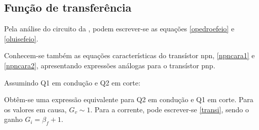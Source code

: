 \documentclass[%
  reprint,
  nofootinbib,
  amsmath,amssymb,
  aps,
  10pt,
  a4paper
]{revtex4-1}
\begin{document}
\subsection{Função de transferência}
Pela análise do circuito da , podem escrever-se as equações \eqref{opedroefeio} e \eqref{oluisefeio}.

Conhecem-se também as equações características do transístor npn, \eqref{npncara1} e \eqref{npncara2}, apresentando expressões análogas para o transístor pnp.


Assumindo Q1 em condução e Q2 em corte:


Obtêm-se uma expressão equivalente para Q2 em condução e Q1 em corte. Para os valores em causa, $G_v \sim 1$. Para a corrente, pode escrever-se \eqref{transi}, sendo o ganho $G_i = \beta_f +1$.
\end{document}
